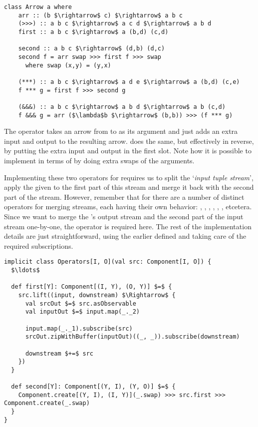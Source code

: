 \begin{lstlisting}[style=HaskellStyle, caption={\textit{Arrow} type class}, label={lst:arrow-typeclass-full}]
class Arrow a where
    arr :: (b $\rightarrow$ c) $\rightarrow$ a b c
    (>>>) :: a b c $\rightarrow$ a c d $\rightarrow$ a b d
    first :: a b c $\rightarrow$ a (b,d) (c,d)
    
    second :: a b c $\rightarrow$ (d,b) (d,c)
    second f = arr swap >>> first f >>> swap
      where swap (x,y) = (y,x)
      
    (***) :: a b c $\rightarrow$ a d e $\rightarrow$ a (b,d) (c,e)
    f *** g = first f >>> second g
    
    (&&&) :: a b c $\rightarrow$ a b d $\rightarrow$ a b (c,d)
    f &&& g = arr ($\lambda$b $\rightarrow$ (b,b)) >>> (f *** g)
\end{lstlisting}

The operator  takes an arrow from  to  as its argument and just adds an extra input and output to the resulting arrow.  does the same, but effectively in reverse, by putting the extra input and output in the first slot. Note how it is possible to implement  in terms of  by doing extra swaps of the arguments.


Implementing these two operators for \comp requires us to split the `\textit{input tuple stream}', apply the given \comp to the first part of this stream and merge it back with the second part of the stream. However, remember that for \obs there are a number of distinct operators for merging streams, each having their own behavior: , , , , , , etcetera. Since we want to merge the \comp's output stream and the second part of the input stream one-by-one, the  operator is required here. The rest of the implementation details are just straightforward, using the earlier defined  and taking care of the required subscriptions.

\begin{lstlisting}[style=InlineScalaStyle]
implicit class Operators[I, O](val src: Component[I, O]) {
  $\ldots$

  def first[Y]: Component[(I, Y), (O, Y)] $=$ {
    src.lift((input, downstream) $\Rightarrow$ {
      val srcOut $=$ src.asObservable
      val inputOut $=$ input.map(_._2)

      input.map(_._1).subscribe(src)
      srcOut.zipWithBuffer(inputOut)((_, _)).subscribe(downstream)

      downstream $+=$ src
    })
  }

  def second[Y]: Component[(Y, I), (Y, O)] $=$ {
    Component.create[(Y, I), (I, Y)](_.swap) >>> src.first >>> Component.create(_.swap)
  }
}
\end{lstlisting}

